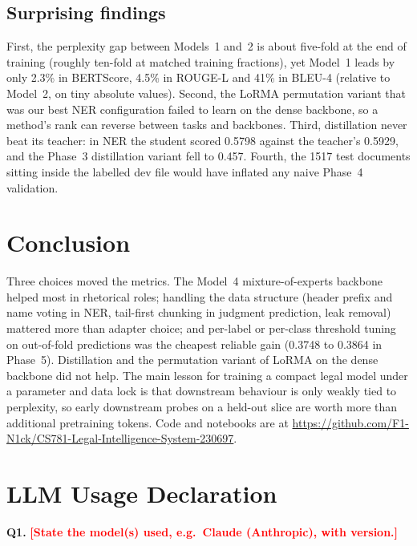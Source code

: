 \documentclass[11pt, oneside]{article}
\newcommand{\todo}[1]{\textcolor{red}{\textbf{[#1]}}}
\begin{document}
\subsection{Surprising findings}
First, the perplexity gap between Models~1 and~2 is about five-fold at the end of training (roughly ten-fold at matched training fractions), yet Model~1 leads by only 2.3\% in BERTScore, 4.5\% in ROUGE-L and 41\% in BLEU-4 (relative to Model~2, on tiny absolute values). Second, the LoRMA permutation variant that was our best NER configuration failed to learn on the dense backbone, so a method's rank can reverse between tasks and backbones. Third, distillation never beat its teacher: in NER the student scored 0.5798 against the teacher's 0.5929, and the Phase~3 distillation variant fell to 0.457. Fourth, the 1517 test documents sitting inside the labelled dev file would have inflated any naive Phase~4 validation.

\section{Conclusion}
Three choices moved the metrics. The Model~4 mixture-of-experts backbone helped most in rhetorical roles; handling the data structure (header prefix and name voting in NER, tail-first chunking in judgment prediction, leak removal) mattered more than adapter choice; and per-label or per-class threshold tuning on out-of-fold predictions was the cheapest reliable gain (0.3748 to 0.3864 in Phase~5). Distillation and the permutation variant of LoRMA on the dense backbone did not help. The main lesson for training a compact legal model under a parameter and data lock is that downstream behaviour is only weakly tied to perplexity, so early downstream probes on a held-out slice are worth more than additional pretraining tokens. Code and notebooks are at \url{https://github.com/F1-N1ck/CS781-Legal-Intelligence-System-230697}.

\clearpage
\section*{LLM Usage Declaration}
\noindent
\textbf{Q1.} \todo{State the model(s) used, e.g.\ Claude (Anthropic), with version.}
\end{document}
